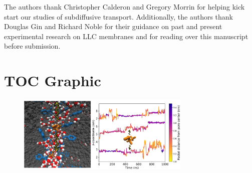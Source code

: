 \documentclass[journal=jpcbfk,manuscript=article]{achemso}
\begin{document}
  The authors thank Christopher Calderon and Gregory Morrin for helping kick start
  our studies of subdiffusive transport. Additionally, the authors thank 
  Douglas Gin and Richard Noble for their guidance on past and present experimental
  research on LLC membranes and for reading over this manuscript before submission.

  \clearpage

  
  

  \newpage

  \section*{TOC Graphic}
  
  \begin{figure}[!htb]
  \centering
  \includegraphics[width=3.25in]{toc_transport.pdf}
  \end{figure}
\end{document}
